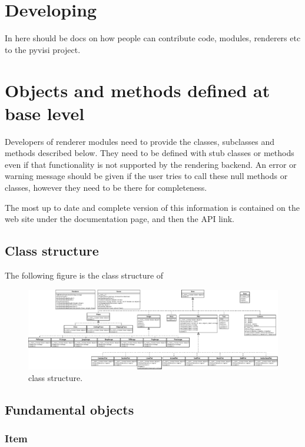 
\chapter{Developing \pyvisi}
\label{chap:developingPyvisi}

In here should be docs on how people can contribute code, modules, renderers
etc to the pyvisi project.

\chapter{Objects and methods defined at base level}

Developers of \pyvisi renderer modules need to provide the classes, subclasses
and methods described below.  They need to be defined with stub classes or
methods even if that functionality is not supported by the rendering backend.
An error or warning message should be given if the user tries to call these
null methods or classes, however they need to be there for completeness.

The most up to date and complete version of this information is contained on
the \pyvisi web site under the documentation page, and then the API link.

\section{Class structure}

The following figure is the class structure of \pyvisi

\begin{figure}
\centerline{%
\includegraphics[width=\textheight,angle=90]{figures/pyvisi_class_structure}%
}
\caption{\pyvisi class structure.}
\end{figure}

\section{Fundamental objects}

\subsection{Item}

